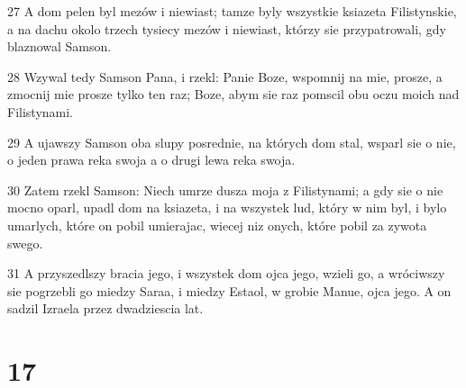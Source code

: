 \par 27 A dom pelen byl mezów i niewiast; tamze byly wszystkie ksiazeta Filistynskie, a na dachu okolo trzech tysiecy mezów i niewiast, którzy sie przypatrowali, gdy blaznowal Samson.
\par 28 Wzywal tedy Samson Pana, i rzekl: Panie Boze, wspomnij na mie, prosze, a zmocnij mie prosze tylko ten raz; Boze, abym sie raz pomscil obu oczu moich nad Filistynami.
\par 29 A ujawszy Samson oba slupy posrednie, na których dom stal, wsparl sie o nie, o jeden prawa reka swoja a o drugi lewa reka swoja.
\par 30 Zatem rzekl Samson: Niech umrze dusza moja z Filistynami; a gdy sie o nie mocno oparl, upadl dom na ksiazeta, i na wszystek lud, który w nim byl, i bylo umarlych, które on pobil umierajac, wiecej niz onych, które pobil za zywota swego.
\par 31 A przyszedlszy bracia jego, i wszystek dom ojca jego, wzieli go, a wróciwszy sie pogrzebli go miedzy Saraa, i miedzy Estaol, w grobie Manue, ojca jego. A on sadzil Izraela przez dwadziescia lat.

\chapter{17}

